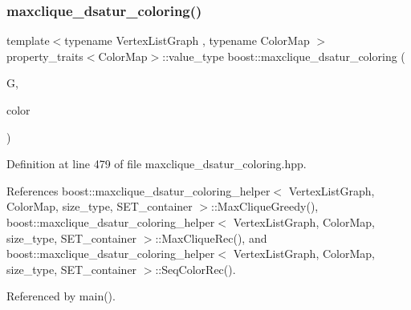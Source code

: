 \subsubsection{\texorpdfstring{maxclique\+\_\+dsatur\+\_\+coloring()}{maxclique\_dsatur\_coloring()}}
{\footnotesize\ttfamily template$<$typename Vertex\+List\+Graph , typename Color\+Map $>$ \\
property\+\_\+traits$<$Color\+Map$>$\+::value\+\_\+type boost\+::maxclique\+\_\+dsatur\+\_\+coloring (\begin{DoxyParamCaption}\item[{const Vertex\+List\+Graph \&}]{G,  }\item[{Color\+Map}]{color }\end{DoxyParamCaption})}



Definition at line 479 of file maxclique\+\_\+dsatur\+\_\+coloring.\+hpp.



References boost\+::maxclique\+\_\+dsatur\+\_\+coloring\+\_\+helper$<$ Vertex\+List\+Graph, Color\+Map, size\+\_\+type, S\+E\+T\+\_\+container $>$\+::\+Max\+Clique\+Greedy(), boost\+::maxclique\+\_\+dsatur\+\_\+coloring\+\_\+helper$<$ Vertex\+List\+Graph, Color\+Map, size\+\_\+type, S\+E\+T\+\_\+container $>$\+::\+Max\+Clique\+Rec(), and boost\+::maxclique\+\_\+dsatur\+\_\+coloring\+\_\+helper$<$ Vertex\+List\+Graph, Color\+Map, size\+\_\+type, S\+E\+T\+\_\+container $>$\+::\+Seq\+Color\+Rec().



Referenced by main().

